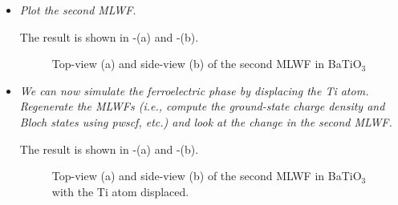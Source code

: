 \begin{itemize}
	\item {\it Plot the second MLWF.}

	The result is shown in -(a) and -(b).
	\begin{figure}[h!]
	\centering
	\centering
	\caption{Top-view (a) and side-view (b) of the second MLWF in BaTiO$_3$ }\label{fig9.1}
	\end{figure}


	\item {\it We can now simulate the ferroelectric phase by displacing the Ti atom. Regenerate the MLWFs (i.e., compute the ground-state charge density and Bloch states using pwscf, etc.) and look at the change in the second MLWF.}

	The result is shown in -(a) and -(b).
	\begin{figure}[h!]
	\centering
	\centering
	\caption{Top-view (a) and side-view (b) of the second MLWF in BaTiO$_3$ with the Ti atom displaced.}\label{fig9.2}
	\end{figure}
\end{itemize}


